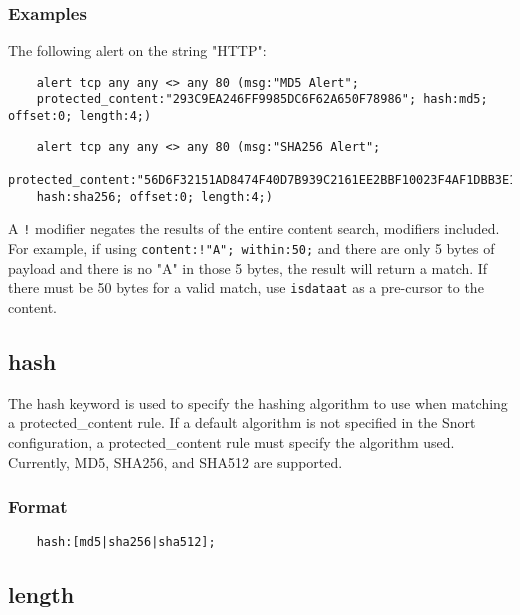 \documentclass[english]{report}
\newenvironment{note}{
\samepage
    \vspace{10pt}{\textsf{
        {\hspace{7pt}\Huge{$\triangle$\hspace{-12.5pt}{\Large{$^!$}}}}\hspace{5pt}
        {\Large{NOTE}}
    }
    }
   \begin{center}
    \par\vspace{-17pt}

    \begin{lrbox}{\savepar}
    \begin{minipage}[r]{6in}
}
{
    \end{minipage}
    \end{lrbox}
    \fbox{
        \usebox{
            \savepar
	}
    }
    \par\vskip10pt
    \end{center}
}
\newenvironment{note}{
        \begin{rawhtml}
        <p><table border="1"><tr><td><b>
        Note:&nbsp;&nbsp;</b>
        \end{rawhtml}
}{
        \begin{rawhtml}
        </b></td></tr></table></p>
        \end{rawhtml}
}
\begin{document}
\subsubsection{Examples}
The following alert on the string "HTTP":

\begin{verbatim}
    alert tcp any any <> any 80 (msg:"MD5 Alert"; 
    protected_content:"293C9EA246FF9985DC6F62A650F78986"; hash:md5; offset:0; length:4;)
\end{verbatim}

\begin{verbatim}
    alert tcp any any <> any 80 (msg:"SHA256 Alert"; 
    protected_content:"56D6F32151AD8474F40D7B939C2161EE2BBF10023F4AF1DBB3E13260EBDC6342"; 
    hash:sha256; offset:0; length:4;)
\end{verbatim}

\begin{note}

A \texttt{!} modifier negates the results of the entire content search,
modifiers included.  For example, if using \texttt{content:!"A"; within:50;}
and there are only 5 bytes of payload and there is no "A" in those 5 bytes, the
result will return a match.  If there must be 50 bytes for a valid match, use
\texttt{isdataat} as a pre-cursor to the content.

\end{note}

\subsection{hash}
\label{sub:hash}

The hash keyword is used to specify the hashing algorithm to use when matching a protected\_content rule. If a default algorithm is not specified in the Snort configuration, a protected\_content rule must specify the algorithm used. Currently, MD5, SHA256, and SHA512 are supported.

\subsubsection{Format}

\begin{verbatim}
    hash:[md5|sha256|sha512];
\end{verbatim}

\subsection{length}
\label{sub:length}
\end{document}
